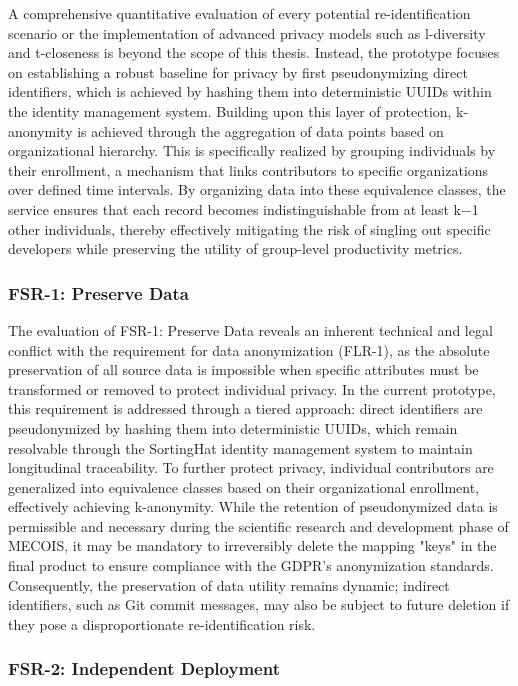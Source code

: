A comprehensive quantitative evaluation of every potential re-identification scenario or the implementation of advanced privacy models such as l-diversity and t-closeness is beyond the scope of this thesis. Instead, the prototype focuses on establishing a robust baseline for privacy by first pseudonymizing direct identifiers, which is achieved by hashing them into deterministic \acp{UUID} within the identity management system. Building upon this layer of protection, k-anonymity is achieved through the aggregation of data points based on organizational hierarchy. This is specifically realized by grouping individuals by their enrollment, a mechanism that links contributors to specific organizations over defined time intervals. By organizing data into these equivalence classes, the service ensures that each record becomes indistinguishable from at least k−1 other individuals, thereby effectively mitigating the risk of singling out specific developers while preserving the utility of group-level productivity metrics.

\subsubsection{FSR-1: Preserve Data}

The evaluation of FSR-1: Preserve Data reveals an inherent technical and legal conflict with the requirement for data anonymization (FLR-1), as the absolute preservation of all source data is impossible when specific attributes must be transformed or removed to protect individual privacy. In the current prototype, this requirement is addressed through a tiered approach: direct identifiers are pseudonymized by hashing them into deterministic \acp{UUID}, which remain resolvable through the SortingHat identity management system to maintain longitudinal traceability. To further protect privacy, individual contributors are generalized into equivalence classes based on their organizational enrollment, effectively achieving k-anonymity. While the retention of pseudonymized data is permissible and necessary during the scientific research and development phase of MECOIS, it may be mandatory to irreversibly delete the mapping "keys" in the final product to ensure compliance with the GDPR’s anonymization standards. Consequently, the preservation of data utility remains dynamic; indirect identifiers, such as Git commit messages, may also be subject to future deletion if they pose a disproportionate re-identification risk.

\subsubsection{FSR-2: Independent Deployment}

